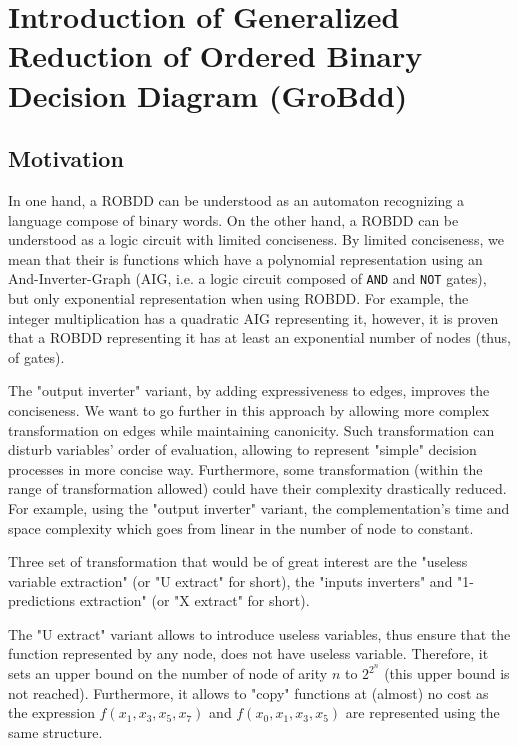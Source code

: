 \documentclass[a4paper,10pt]{article}
\begin{document}
\section{Introduction of Generalized Reduction of Ordered Binary Decision Diagram (GroBdd)}

\subsection{Motivation}

In one hand, a ROBDD can be understood as an automaton recognizing a language compose of binary words.
On the other hand, a ROBDD can be understood as a logic circuit with limited conciseness.
By limited conciseness, we mean that their is functions which have a polynomial representation using an And-Inverter-Graph (AIG, i.e. a logic circuit composed of \texttt{AND} and \texttt{NOT} gates), but only exponential representation when using ROBDD.
For example, the integer multiplication has a quadratic AIG representing it, however, it is proven \cite{Bryant1986} that a ROBDD representing it has at least an exponential number of nodes (thus, of gates).

The "output inverter" variant, by adding expressiveness to edges, improves the conciseness.
We want to go further in this approach by allowing more complex transformation on edges while maintaining canonicity.
Such transformation can disturb variables' order of evaluation, allowing to represent "simple" decision processes in more concise way.
Furthermore, some transformation (within the range of transformation allowed) could have their complexity drastically reduced.
For example, using the "output inverter" variant, the complementation's time and space complexity which goes from linear in the number of node to constant.

Three set of transformation that would be of great interest are the "useless variable extraction" (or "U extract" for short), the "inputs inverters" and "1-predictions extraction" (or "X extract" for short).


The "U extract" variant allows to introduce useless variables, thus ensure that the function represented by any node, does not have useless variable.
Therefore, it sets an upper bound on the number of node of arity $n$ to $2^{2^n}$ (this upper bound is not reached).
Furthermore, it allows to "copy" functions at (almost) no cost as the expression $f(x_1, x_3, x_5, x_7)$ and $f(x_0, x_1, x_3, x_5)$ are represented using the same structure.
\end{document}

